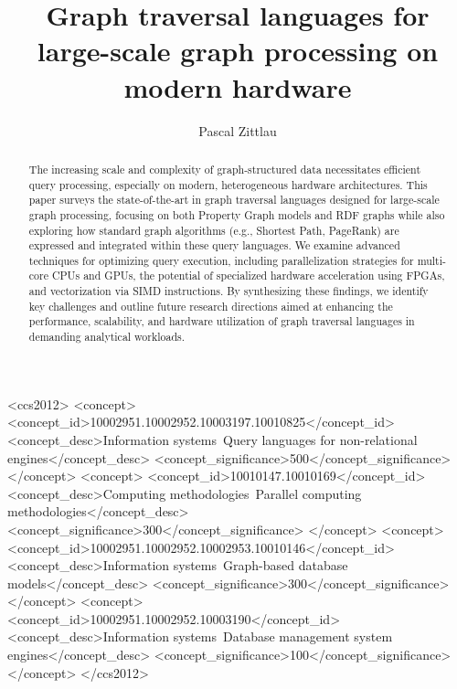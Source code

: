 \documentclass[sigconf,natbib=false]{acmart}
\begin{document}
\title{Graph traversal languages for large-scale graph processing on modern hardware}

\author{Pascal Zittlau}

\begin{abstract}
	The increasing scale and complexity of graph-structured data necessitates efficient query processing, especially on modern, heterogeneous hardware architectures.
	This paper surveys the state-of-the-art in graph traversal languages designed for large-scale graph processing, focusing on both Property Graph models and RDF graphs while also exploring how standard graph algorithms (e.g., Shortest Path, PageRank) are expressed and integrated within these query languages.
	We examine advanced techniques for optimizing query execution, including parallelization strategies for multi-core CPUs and GPUs, the potential of specialized hardware acceleration using FPGAs, and vectorization via SIMD instructions.
	By synthesizing these findings, we identify key challenges and outline future research directions aimed at enhancing the performance, scalability, and hardware utilization of graph traversal languages in demanding analytical workloads.
\end{abstract}

\begin{CCSXML}
	<ccs2012>
	<concept>
	<concept_id>10002951.10002952.10003197.10010825</concept_id>
	<concept_desc>Information systems~Query languages for non-relational engines</concept_desc>
	<concept_significance>500</concept_significance>
	</concept>
	<concept>
	<concept_id>10010147.10010169</concept_id>
	<concept_desc>Computing methodologies~Parallel computing methodologies</concept_desc>
	<concept_significance>300</concept_significance>
	</concept>
	<concept>
	<concept_id>10002951.10002952.10002953.10010146</concept_id>
	<concept_desc>Information systems~Graph-based database models</concept_desc>
	<concept_significance>300</concept_significance>
	</concept>
	<concept>
	<concept_id>10002951.10002952.10003190</concept_id>
	<concept_desc>Information systems~Database management system engines</concept_desc>
	<concept_significance>100</concept_significance>
	</concept>
	</ccs2012>
\end{CCSXML}

\end{document}
